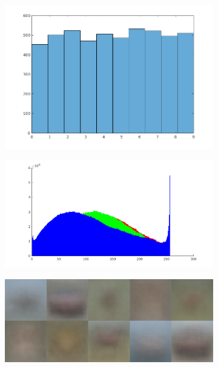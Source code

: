 \documentclass{article} %
\begin{document}
    \begin{figure}
        \centering
        \begin{subfigure}{.2\linewidth}
            \centering
            \includegraphics[width=\linewidth]{images/label-distribution.png}
        \caption{}
        \end{subfigure}
        \begin{subfigure}{.2\linewidth}
            \centering
            \includegraphics[width=\linewidth]{images/hist-overall.png}
        \caption{}
        \end{subfigure}
        \begin{subfigure}{.2\linewidth}
            \centering
            \includegraphics[width=\linewidth]{images/avg-img.png}

\end{subfigure}
\end{figure}
\end{document}
